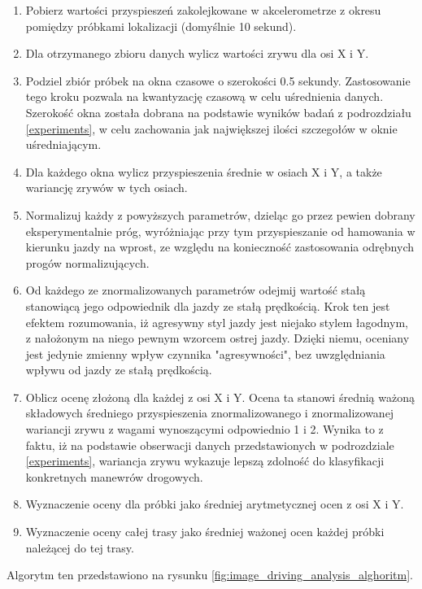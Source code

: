 \begin{enumerate}
\item Pobierz wartości przyspieszeń zakolejkowane w akcelerometrze z okresu pomiędzy próbkami lokalizacji (domyślnie 10 sekund).
\item Dla otrzymanego zbioru danych wylicz wartości zrywu dla osi X i Y.
\item Podziel zbiór próbek na okna czasowe o szerokości 0.5 sekundy. Zastosowanie tego kroku pozwala na kwantyzację czasową w celu uśrednienia danych. Szerokość okna została dobrana na podstawie wyników badań z podrozdziału \ref{experiments}, w celu zachowania jak największej ilości szczegołów w oknie uśredniającym.
\item Dla każdego okna wylicz przyspieszenia średnie w osiach X i Y, a także wariancję zrywów w tych osiach.
\item Normalizuj każdy z powyższych parametrów, dzieląc go przez pewien dobrany eksperymentalnie próg, wyróżniając przy tym przyspieszanie od hamowania w kierunku jazdy na wprost, ze względu na konieczność zastosowania odrębnych progów normalizujących.
\item Od każdego ze znormalizowanych parametrów odejmij wartość stałą stanowiącą jego odpowiednik dla jazdy ze stałą prędkością. Krok ten jest efektem rozumowania, iż agresywny styl jazdy jest niejako stylem łagodnym, z nałożonym na niego pewnym wzorcem ostrej jazdy. Dzięki niemu, oceniany jest jedynie zmienny wpływ czynnika "agresywności", bez uwzględniania wpływu od jazdy ze stałą prędkością.
\item Oblicz ocenę złożoną dla każdej z osi X i Y. Ocena ta stanowi średnią ważoną składowych średniego przyspieszenia znormalizowanego i znormalizowanej wariancji zrywu z wagami wynoszącymi odpowiednio 1 i 2. Wynika to z faktu, iż na podstawie obserwacji danych przedstawionych w podrozdziale \ref{experiments}, wariancja zrywu wykazuje lepszą zdolność do klasyfikacji konkretnych manewrów drogowych.
\item Wyznaczenie oceny dla próbki jako średniej arytmetycznej ocen z osi X i Y.
\item Wyznaczenie oceny całej trasy jako średniej ważonej ocen każdej próbki należącej do tej trasy.
\end{enumerate}

Algorytm ten przedstawiono na rysunku \ref{fig:image_driving_analysis_alghoritm}.

